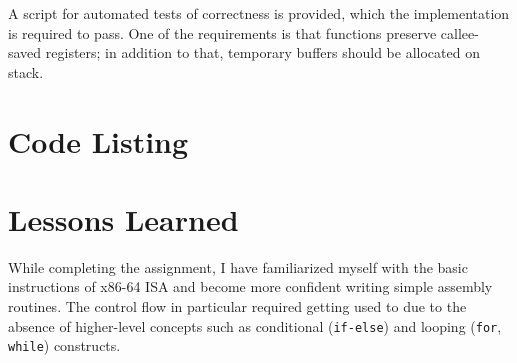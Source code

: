 \documentclass[en, listings]{labreport}
\begin{document}
A script for automated tests of correctness is provided, which the implementation is required to pass. One of the requirements is that functions preserve callee-saved registers; in addition to that, temporary buffers should be allocated on stack.

\section*{Code Listing}



\section*{Lessons Learned}

While completing the assignment, I have familiarized myself with the basic instructions of x86-64 ISA and become more confident writing simple assembly routines. The control flow in particular required getting used to due to the absence of higher-level concepts such as conditional (\texttt{if-else}) and looping (\texttt{for}, \texttt{while}) constructs.
\end{document}
